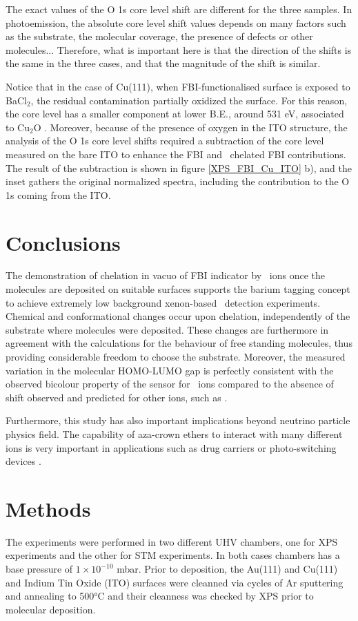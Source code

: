 \documentclass[aps,prl,reprint,longbibliography,superscriptaddress, english]{revtex4-1}
\def\BappCl{BaCl$_2$}
\begin{document}
The exact values of the O 1s core level shift are different for the three samples. In photoemission, the absolute core level shift values depends on many factors such as the substrate, the molecular coverage, the presence of defects or other molecules... Therefore, what is important here is that the direction of the shifts is the same in the three cases, and that the magnitude of the shift is similar. 

Notice that in the case of Cu(111), when FBI-functionalised surface is exposed to \BappCl, the residual contamination partially oxidized the surface. For this reason, the core level has a smaller component at lower B.E., around 531 eV, associated to  Cu$_2$O \cite{zhu_surface_2013}. Moreover, because of the presence of oxygen in the ITO structure, the analysis of the O 1s core level shifts required a subtraction of the core level measured on the bare ITO to enhance the FBI and \Bapp\ chelated FBI contributions. The result of the subtraction is shown in figure \ref{XPS_FBI_Cu_ITO} b), and the inset gathers the original normalized spectra, including the contribution to the  O 1s coming from the ITO.  


\section{Conclusions}
The demonstration of chelation in vacuo of FBI indicator by \Bapp\ ions once the molecules are deposited on suitable surfaces supports the barium tagging concept to achieve extremely low background xenon-based \bbonu\ detection experiments. Chemical and conformational changes occur upon chelation, independently of the substrate where molecules were deposited. These changes are furthermore in agreement with the calculations for the behaviour of free standing molecules, thus providing considerable freedom to choose the substrate. Moreover, the measured variation in the molecular HOMO-LUMO gap is perfectly consistent with the observed bicolour property of the sensor for \Bapp\ ions compared to the absence of shift observed and predicted for other ions, such as \Nap.  

Furthermore, this study has also important implications beyond neutrino particle physics field. The capability of {aza-crown ethers} to interact with many different ions is very important in applications such as drug carriers \cite{uchegbu_non-ionic_1998} or photo-switching devices \cite{malval_photoswitching_2002,uda_membrane_2005}. 


\section{Methods}
The experiments were performed in two different UHV chambers, one for XPS experiments and the other for STM experiments. In both cases chambers has a base pressure of $1\times10^{-10}$ mbar. Prior to deposition, the Au(111) and Cu(111) and Indium Tin Oxide (ITO) surfaces were cleanned via cycles of Ar sputtering and annealing to 500°C and their cleanness was checked by XPS prior to molecular deposition. 
\end{document}
